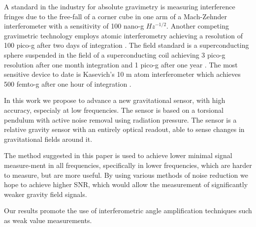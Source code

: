 \documentclass[\main/master.tex]{subfiles}
\begin{document}
\fi
\par\noindent
A standard in the industry for absolute gravimetry is measuring interference fringes due to the free-fall of a corner cube in one arm of a Mach-Zehnder interferometer with a sensitivity of 100 nano-g $Hz^{-1/2}$. Another competing gravimetric technology employs atomic interferometry achieving a resolution of 100 pico-g after two days of integration \cite{Peters01}. 
The field standard is a superconducting sphere suspended in the field of a superconducting coil achieving 3 pico-g resolution after one month integration and 1 pico-g  after one year \cite{Goodkind99}. 
The most sensitive device to date is Kasevich's 10 m atom interferometer which achieves 500 femto-g after one hour of integration \cite{PhysRevA.91.033629,kasevich2014prospects}. 
\par\noindent
In this work we propose to advance a new gravitational sensor, with high accuracy, especialy at low frequencies. The sensor is based on a torsional pendulum with active noise removal using radiation pressure. The sensor is a relative gravity sensor with an entirely optical readout, able to sense changes in gravitational fields around it. 
\iffalse
\fi
\par\noindent
The method suggested in this paper is used to achieve lower minimal signal measure-ment in all frequencies, specifically in lower frequencies, which are harder to measure, but are more useful. By using various methods of noise reduction we hope to achieve higher SNR, which would allow the measurement of significantly weaker gravity field signals.
\par\noindent
Our results promote the use of interferometric angle amplification techniques such as weak value measurements. 
\par\noindent
\iffalse
\begin{itemize}
	\item One
	\item Two
	\item Three
\end{itemize}
\fi
\end{document}
